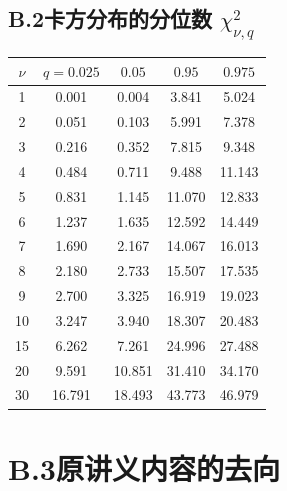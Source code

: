 \begin{minipage}[t]{0.4\linewidth}
\subsection*{B.2\quad 卡方分布的分位数 \texorpdfstring{$\chi^2_{\nu,q}$}{chi2(ν,q)}}
\footnotesize\linespread{1.0}\selectfont\renewcommand{\arraystretch}{1.08}
\begin{tabular}{c*{4}{c}}
\toprule
$\nu$ & $q=0.025$ & $0.05$ & $0.95$ & $0.975$\\
\midrule
1 & 0.001 & 0.004 & 3.841 & 5.024 \\
2 & 0.051 & 0.103 & 5.991 & 7.378 \\
3 & 0.216 & 0.352 & 7.815 & 9.348 \\
4 & 0.484 & 0.711 & 9.488 & 11.143 \\
5 & 0.831 & 1.145 & 11.070 & 12.833 \\
6 & 1.237 & 1.635 & 12.592 & 14.449 \\
7 & 1.690 & 2.167 & 14.067 & 16.013 \\
8 & 2.180 & 2.733 & 15.507 & 17.535 \\
9 & 2.700 & 3.325 & 16.919 & 19.023 \\
10 & 3.247 & 3.940 & 18.307 & 20.483 \\
15 & 6.262 & 7.261 & 24.996 & 27.488 \\
20 & 9.591 & 10.851 & 31.410 & 34.170 \\
30 & 16.791 & 18.493 & 43.773 & 46.979 \\
\bottomrule
\end{tabular}
\end{minipage}

\clearpage
\section*{B.3\quad 原讲义内容的去向}

